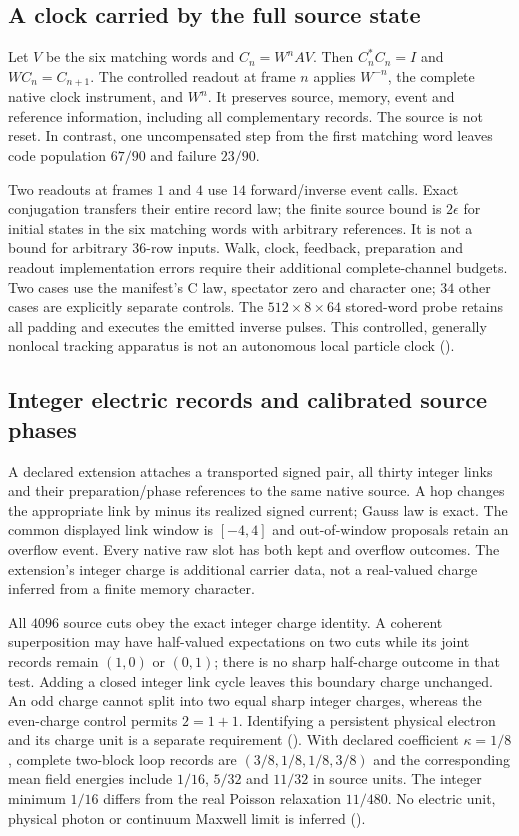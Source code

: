 \subsection{A clock carried by the full source state}

Let $V$ be the six matching words and $C_n=W^nAV$. Then
$C_n^*C_n=I$ and $WC_n=C_{n+1}$. The controlled readout at frame $n$ applies
$W^{-n}$, the complete native clock instrument, and $W^n$. It preserves
source, memory, event and reference information, including all complementary
records. The source is not reset. In contrast, one uncompensated step from
the first matching word leaves code population $67/90$ and failure $23/90$.

Two readouts at frames $1$ and $4$ use $14$ forward/inverse event calls.
Exact conjugation transfers their entire record law; the finite source
bound is $2\epsilon$ for initial states in the six matching words with
arbitrary references. It is not a bound for arbitrary $36$-row inputs.
Walk, clock, feedback, preparation and readout implementation errors require
their additional complete-channel budgets. Two cases use the manifest's
C law, spectator zero and character one; $34$ other cases are explicitly
separate controls. The $512\times8\times64$ stored-word probe retains all
padding and executes the emitted inverse pulses. This controlled, generally
nonlocal tracking apparatus is not an autonomous local particle clock
().

\subsection{Integer electric records and calibrated source phases}

A declared extension attaches a transported signed pair, all thirty integer
links and their preparation/phase references to the same native source.
A hop changes the appropriate link by minus its realized signed current;
Gauss law is exact. The common displayed link window is $[-4,4]$ and
out-of-window proposals retain an overflow event. Every native raw slot
has both kept and overflow outcomes. The extension's integer charge is
additional carrier data, not a real-valued charge inferred from a finite
memory character.

All $4096$ source cuts obey the exact integer charge identity. A coherent
superposition may have half-valued expectations on two cuts while its joint
records remain $(1,0)$ or $(0,1)$; there is no sharp half-charge outcome in
that test. Adding a closed integer link cycle leaves this boundary charge
unchanged. An odd charge cannot split into two equal sharp integer charges,
whereas the even-charge control permits $2=1+1$. Identifying a persistent
physical electron and its charge unit is a separate requirement
(). With declared coefficient $\kappa=1/8$, complete two-block loop
records are $(3/8,1/8,1/8,3/8)$ and the corresponding mean field energies
include $1/16$, $5/32$ and $11/32$ in source units. The integer minimum
$1/16$ differs from the real Poisson relaxation $11/480$. No electric unit,
physical photon or continuum Maxwell limit is inferred
().

